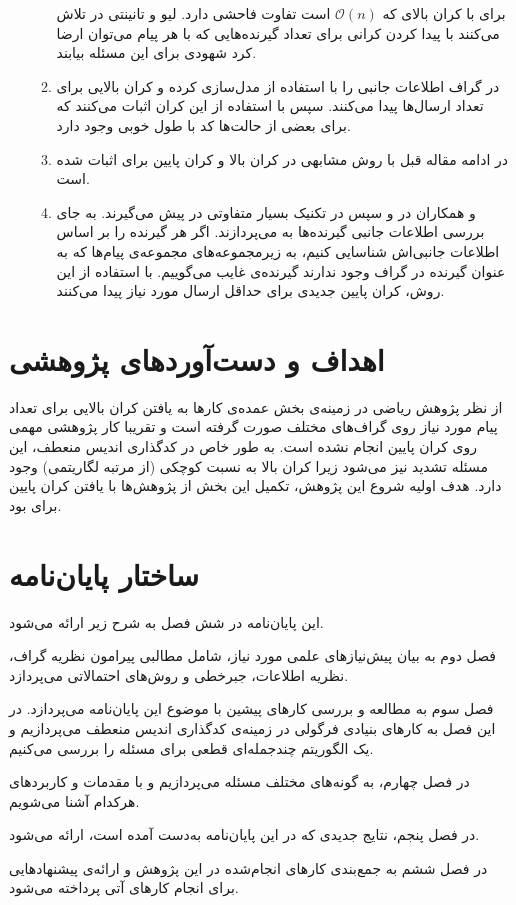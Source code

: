 \begin{enumerate}
\begin{enumerate}
 		برای
 		\picod
 		با کران بالای
 		\icod
 		که
 		$\mathcal{O}(n)$
 		است تفاوت فاحشی دارد. لیو و تانینتی در
 		\cite{7606849}
 		تلاش می‌کنند با پیدا کردن کرانی برای تعداد گیرنده‌هایی که با هر پیام می‌توان ارضا کرد شهودی برای این مسئله بیابند.
 		\item 
 		در
 		\cite{9518120}
 		گراف اطلاعات جانبی را با استفاده از 
 		مدل‌سازی کرده و کران بالایی برای تعداد ارسال‌ها پیدا می‌کنند. سپس با استفاده از این کران اثبات می‌کنند که برای بعضی از حالت‌ها کد با طول خوبی وجود دارد.
 		\item
 		در ادامه مقاله قبل با روش مشابهی در
 		\cite{9965883}
 		کران بالا و کران پایین برای
 		\picod
 		اثبات شده است.
 		\item
 		و همکاران در
 		\cite{ong2019improved}
 		و سپس در
 		\cite{8849527}
 		تکنیک بسیار متفاوتی در پیش می‌گیرند. به جای بررسی اطلاعات جانبی گیرنده‌ها به 
 		می‌پردازند. اگر هر گیرنده را بر اساس اطلاعات جانبی‌اش شناسایی کنیم، به زیرمجموعه‌های مجموعه‌ی پیام‌ها که به عنوان گیرنده در گراف وجود ندارند گیرنده‌ی غایب می‌گوییم. با استفاده از این روش، کران پایین جدیدی برای حداقل ارسال مورد نیاز پیدا می‌کنند.
 	\end{enumerate}
 \end{enumerate}
 
\pagebreak 
\section{اهداف و دست‌آورد‌های پژوهشی}
از نظر پژوهش ریاضی در زمینه‌ی \picod بخش عمده‌ی کارها به یافتن کران بالایی برای تعداد پیام مورد نیاز روی گراف‌های مختلف صورت گرفته است و تقریبا کار پژوهشی‌ مهمی روی کران پایین انجام نشده است. به طور خاص در کدگذاری اندیس منعطف، این مسئله تشدید نیز می‌شود زیرا کران بالا به نسبت کوچکی (از مرتبه لگاریتمی) وجود دارد. هدف اولیه شروع این پژوهش‌، تکمیل این بخش از پژوهش‌ها با یافتن کران پایین برای \picod بود.
\section{ساختار پایان‌نامه}

این پایان‌نامه در شش فصل به شرح زیر ارائه می‌شود.

فصل دوم به بیان پیش‌نیازهای علمی مورد نیاز، شامل مطالبی پیرامون نظریه گراف، نظریه اطلاعات، جبرخطی و روش‌های احتمالاتی می‌پردازد.

فصل سوم به مطالعه و بررسی کارهای پیشین با موضوع این پایان‌نامه می‌پردازد. در این فصل به کارهای بنیادی فرگولی در زمینه‌ی کدگذاری اندیس منعطف می‌پردازیم و یک الگوریتم چندجمله‌ای قطعی برای مسئله را بررسی می‌کنیم.

در فصل چهارم، به گونه‌های مختلف مسئله می‌پردازیم و با مقدمات و کاربردهای هرکدام آشنا می‌شویم.

در فصل پنجم، نتایج جدیدی که در این پایان‌نامه به‌دست آمده است، ارائه می‌شود.

در فصل ششم به جمع‌بندی کارهای انجام‌شده در این پژوهش و ارائه‌ی پیشنهادهایی برای انجام کارهای آتی پرداخته می‌شود.